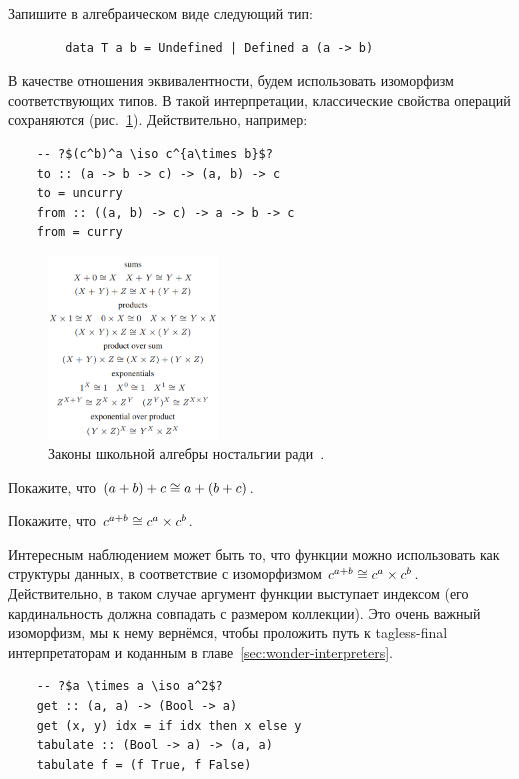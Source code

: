 \begin{task}
    Запишите в алгебраическом виде следующий тип:
    \begin{verbatim}
        data T a b = Undefined | Defined a (a -> b)
    \end{verbatim}
\end{task}

В качестве отношения эквивалентности, будем использовать изоморфизм соответствующих типов.
В такой интерпретации, классические свойства операций сохраняются (рис.~\ref{fig:school-alg}).
Действительно, например:
\begin{verbatim}
    -- ?$(c^b)^a \iso c^{a\times b}$?
    to :: (a -> b -> c) -> (a, b) -> c
    to = uncurry
    from :: ((a, b) -> c) -> a -> b -> c
    from = curry
\end{verbatim}

\begin{figure}
    \centering
    \includegraphics[width=0.4\textwidth]{figs/school-alg}
    \caption{Законы школьной алгебры ностальгии ради~\cite{hinze2010reason}.}
    \label{fig:school-alg}
\end{figure}

\begin{task}
    Покажите, что $(a + b) + c \cong a + (b + c)$.
\end{task}

\begin{task}
    Покажите, что $c^{a + b} \cong c^a\times c^b$.
\end{task}

Интересным наблюдением может быть то, что функции можно использовать как структуры данных, в соответствие с изоморфизмом $c^{a + b} \cong c^a\times c^b$.
Действительно, в таком случае аргумент функции выступает индексом (его кардинальность должна совпадать с размером коллекции).
Это очень важный изоморфизм, мы к нему вернёмся, чтобы проложить путь к tagless-final интерпретаторам и коданным в главе~\ref{sec:wonder-interpreters}.
\begin{verbatim}
    -- ?$a \times a \iso a^2$?
    get :: (a, a) -> (Bool -> a)
    get (x, y) idx = if idx then x else y
    tabulate :: (Bool -> a) -> (a, a)
    tabulate f = (f True, f False)
\end{verbatim}


